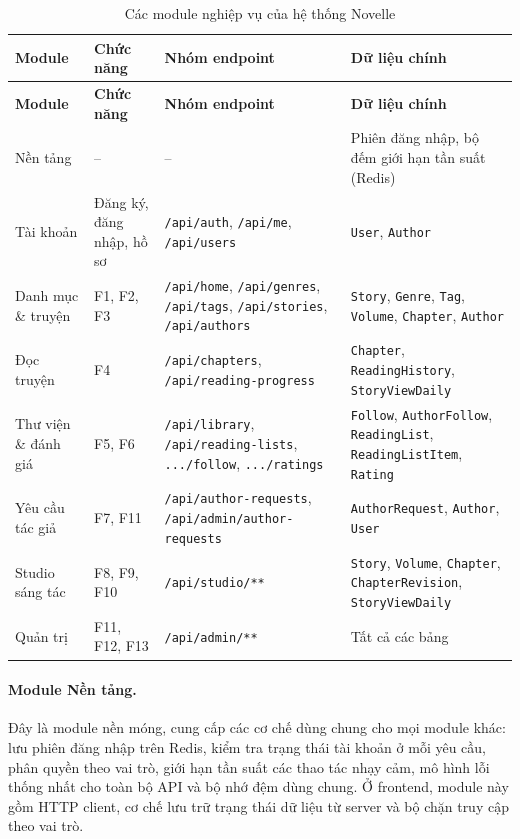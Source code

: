 {\small
\renewcommand{\arraystretch}{1.3}
\begin{longtable}{|>{\raggedright\arraybackslash}p{2.6cm}|>{\raggedright\arraybackslash}p{1.9cm}|>{\raggedright\arraybackslash}p{5.2cm}|>{\raggedright\arraybackslash}p{5.2cm}|}
\caption{Các module nghiệp vụ của hệ thống Novelle}\label{tab:system-modules}\\
\hline
\textbf{Module} & \textbf{Chức năng} & \textbf{Nhóm endpoint} & \textbf{Dữ liệu chính} \\ \hline
\endfirsthead
\hline
\textbf{Module} & \textbf{Chức năng} & \textbf{Nhóm endpoint} & \textbf{Dữ liệu chính} \\ \hline
\endhead
Nền tảng & -- & -- & Phiên đăng nhập, bộ đếm giới hạn tần suất (Redis) \\ \hline
Tài khoản & Đăng ký, đăng nhập, hồ sơ & \texttt{/api/auth}, \texttt{/api/me}, \texttt{/api/users} & \texttt{User}, \texttt{Author} \\ \hline
Danh mục \& truyện & F1, F2, F3 & \texttt{/api/home}, \texttt{/api/genres}, \texttt{/api/tags}, \texttt{/api/stories}, \texttt{/api/authors} & \texttt{Story}, \texttt{Genre}, \texttt{Tag}, \texttt{Volume}, \texttt{Chapter}, \texttt{Author} \\ \hline
Đọc truyện & F4 & \texttt{/api/chapters}, \texttt{/api/reading-progress} & \texttt{Chapter}, \texttt{ReadingHistory}, \texttt{StoryViewDaily} \\ \hline
Thư viện \& đánh giá & F5, F6 & \texttt{/api/library}, \texttt{/api/reading-lists}, \texttt{.../follow}, \texttt{.../ratings} & \texttt{Follow}, \texttt{AuthorFollow}, \texttt{ReadingList}, \texttt{ReadingListItem}, \texttt{Rating} \\ \hline
Yêu cầu tác giả & F7, F11 & \texttt{/api/author-requests}, \texttt{/api/admin/author-requests} & \texttt{AuthorRequest}, \texttt{Author}, \texttt{User} \\ \hline
Studio sáng tác & F8, F9, F10 & \texttt{/api/studio/**} & \texttt{Story}, \texttt{Volume}, \texttt{Chapter}, \texttt{ChapterRevision}, \texttt{StoryViewDaily} \\ \hline
Quản trị & F11, F12, F13 & \texttt{/api/admin/**} & Tất cả các bảng \\ \hline
\end{longtable}
}

\paragraph{Module Nền tảng.} Đây là module nền móng, cung cấp các cơ chế dùng chung cho mọi module khác: lưu phiên đăng nhập trên Redis, kiểm tra trạng thái tài khoản ở mỗi yêu cầu, phân quyền theo vai trò, giới hạn tần suất các thao tác nhạy cảm, mô hình lỗi thống nhất cho toàn bộ API và bộ nhớ đệm dùng chung. Ở frontend, module này gồm HTTP client, cơ chế lưu trữ trạng thái dữ liệu từ server và bộ chặn truy cập theo vai trò.

